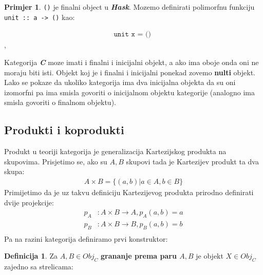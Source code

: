 \documentclass[11pt]{article}
\newcommand{\category}[1]{\textbf{\emph{#1}}}
\newcommand{\codei}[1]{
  {\lstinline[basicstyle=\ttfamily]{#1}}
}
\newcommand{\code}[1]{
  \begin{align*}
    \texttt{#1}
  \end{align*}
  }
\theoremstyle{definition}
\newtheorem{definition}{Definicija}
\newtheorem{primjer}{Primjer}
\begin{document}
  \begin{primjer} \codei{()} je finalni object u \category{Hask}.
    Mozemo definirati polimorfnu funkciju \codei{unit :: a -> ()} kao:
    \code{
      unit x = ()
    },
  \end{primjer}
  Kategorija \category{C} moze imati i finalni i inicijalni objekt, a ako ima
  oboje onda oni ne moraju biti isti. Objekt koj je i finalni i inicijalni ponekad
  zovemo \textbf{nulti} objekt. Lako se pokaze da ukoliko kategorija ima dva inicijalna
  objekta da su oni izomorfni pa ima smisla govoriti o inicijalnom objektu
  kategorije (analogno ima smisla govoriti o finalnom objektu).
  \subsection{Produkti i koprodukti}
  Produkt u teoriji kategorija je generalizacija Kartezijskog produkta na
  skupovima. Prisjetimo se, ako su $A, B$ skupovi tada je Kartezijev produkt ta
  dva skupa:
  \begin{align*}
    A \times B = \{ (a, b) | a \in A, b \in B\}
  \end{align*}
  Primijetimo da je uz takvu definiciju Kartezijevog produkta prirodno
  definirati dvije projekcije:
  \begin{align*}
    p_A &: A \times B \to A, p_A(a, b) = a\\
    p_B &: A \times B \to B, p_B(a, b) = b\\
  \end{align*}
  Pa na razini kategorija definiramo prvi konstruktor:
  \begin{definition}
    Za $A, B \in Obj_C$ \textbf{grananje prema paru $A, B$} je objekt $X \in
    Obj_C$
    zajedno sa strelicama:
  \begin{center}
  \end{center}
  \end{definition}
\end{document}
